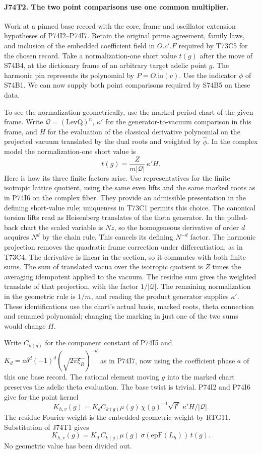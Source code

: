 \paragraph{J74T2. The two point comparisons use one common multiplier.}
Work at a pinned base record with the core, frame and oscillator
extension hypotheses of P74I2--P74I7. Retain the original prime
agreement, family laws, and inclusion of the embedded coefficient
field in $O.c'.F$ required by T73C5 for the chosen record.
Take a normalization-one
short value $t(g)$ after the move of S74B4, at the dictionary frame
of an arbitrary target adelic point $g$. The harmonic pin represents
its polynomial by $P=O.\mathrm{io}(v)$.
Use the indicator $\phi$ of S74B1. We can now supply both point
comparisons required by S74B5 on these data.

To see the normalization geometrically, use the marked period chart
of the given frame. Write $\mathcal Q=(\mathrm{LevQ})^n$,
$\kappa'$ for the generator-to-vacuum comparison in this frame,
and $H$ for the evaluation of the classical derivative polynomial
on the projected vacuum translated by the dual roots and weighted
by $\widehat\phi$. In the complex model the normalization-one
short value is
\[
            t(g)=\frac{Z}{m|\mathcal Q|}\,\kappa' H .
\]
Here is how its three finite factors arise. Use representatives for
the finite isotropic lattice quotient, using the same even lifts
and the same marked roots as in P74I6 on the
complex fiber. They provide an admissible presentation in the
defining short-value rule; uniqueness in T73C1 permits this choice.
The canonical torsion lifts read as Heisenberg translates of the
theta generator. In the pulled-back chart the scaled variable is
$Nz$, so the homogeneous derivative of order $d$ acquires $N^d$
by the chain rule. This cancels its defining $N^{-d}$ factor.
The harmonic projection removes the quadratic frame correction under
differentiation, as in T73C4. The derivative is linear in the section,
so it commutes with both
finite sums. The sum of translated vacua over the isotropic quotient
is $Z$ times the averaging idempotent applied to the vacuum. The residue sum gives the
weighted translate of that projection, with the factor
$1/|\mathcal Q|$. The remaining normalization in the geometric
rule is $1/m$, and reading the product generator supplies $\kappa'$.
These identifications use the chart's actual basis, marked roots,
theta connection and renamed polynomial; changing the marking in
just one of the two sums would change $H$.

Write $C_{k(g)}$ for the component constant of P74I5 and
$K_d=a\delta^d(-1)^d(\sqrt{2\pi\xi_R})^{-d}$ as in P74I7,
now using the coefficient phase $a$ of this one base record.
The rational element moving $g$ into the marked chart preserves the
adelic theta evaluation. The base twist is trivial. P74I2 and P74I6
give for the point kernel
\[
 K_{h,v}(g)=K_d C_{k(g)}\mu(g)\,
       \chi(y)^{-1}\sqrt{I^r}\,\kappa'H/|\mathcal Q|.
\]
The residue Fourier weight is the embedded geometric weight by RTG11.
Substitution of J74T1 gives
\[
 K_{h,v}(g)=K_d\, C_{k(g)}\mu(g)\,
                   \sigma(\mathrm{epF}(L_h))\, t(g).
\]
No geometric value has been divided out.

